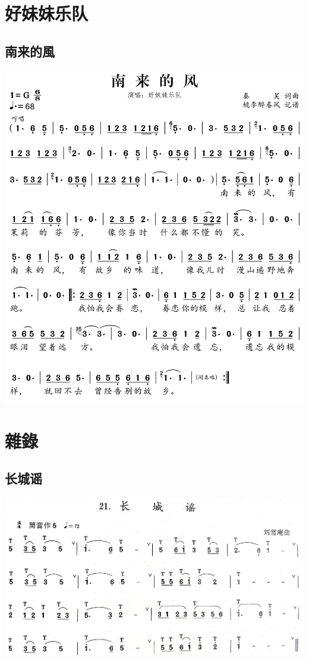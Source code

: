 \documentclass[cn,pad,twocol]{elegantbook}
\begin{document}
\chapter{好妹妹乐队}
\section{南来的風}
    \includegraphics[width=\textwidth]{dongxiao/20200516-好妹妹-南来的风.jpg} 
    
\chapter{雜錄}
\section{长城谣}
    \includegraphics[width=\textwidth]{dongxiao/20200711-长城谣.jpg}
\end{document}
